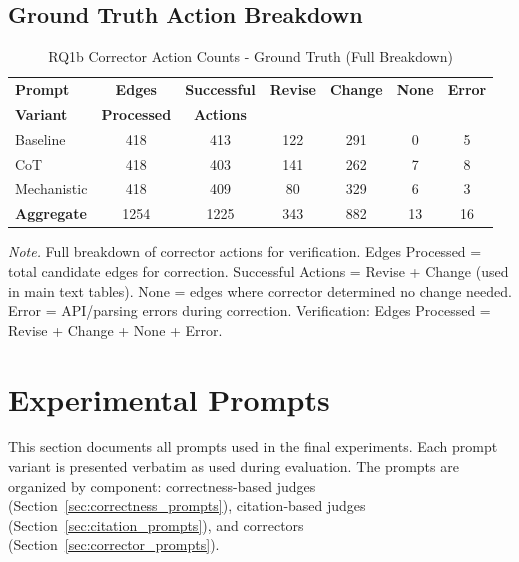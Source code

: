 \subsection{Ground Truth Action Breakdown}

\begin{table}[H]
\centering
\caption{RQ1b Corrector Action Counts - Ground Truth (Full Breakdown)}
\label{tab:rq1b_action_counts_groundtruth}
\begin{threeparttable}
\begin{tabular}{lcccccc}
\toprule
\textbf{Prompt} & \textbf{Edges} & \textbf{Successful} & \textbf{Revise} & \textbf{Change} & \textbf{None} & \textbf{Error} \\
\textbf{Variant} & \textbf{Processed} & \textbf{Actions} & & & & \\
\midrule
Baseline & 418 & 413 & 122 & 291 & 0 & 5 \\
CoT & 418 & 403 & 141 & 262 & 7 & 8 \\
Mechanistic & 418 & 409 & 80 & 329 & 6 & 3 \\
\midrule
\textbf{Aggregate} & 1254 & 1225 & 343 & 882 & 13 & 16 \\
\bottomrule
\end{tabular}
\begin{tablenotes}
\small
\item \textit{Note.} Full breakdown of corrector actions for verification. 
Edges Processed = total candidate edges for correction.
Successful Actions = Revise + Change (used in main text tables).
None = edges where corrector determined no change needed.
Error = API/parsing errors during correction.
Verification: Edges Processed = Revise + Change + None + Error.
\end{tablenotes}
\end{threeparttable}
\end{table}



\section{Experimental Prompts}
\label{sec:appendix_prompts}

This section documents all prompts used in the final experiments. Each prompt variant is presented verbatim as used during evaluation. The prompts are organized by component: correctness-based judges (Section~\ref{sec:correctness_prompts}), citation-based judges (Section~\ref{sec:citation_prompts}), and correctors (Section~\ref{sec:corrector_prompts}).


